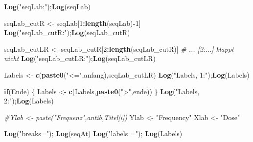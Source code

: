 \documentclass[
]{article}
\newenvironment{Shaded}{\begin{snugshade}}{\end{snugshade}}
\newcommand{\CommentTok}[1]{\textcolor[rgb]{0.56,0.35,0.01}{\textit{#1}}}
\newcommand{\ControlFlowTok}[1]{\textcolor[rgb]{0.13,0.29,0.53}{\textbf{#1}}}
\newcommand{\DecValTok}[1]{\textcolor[rgb]{0.00,0.00,0.81}{#1}}
\newcommand{\KeywordTok}[1]{\textcolor[rgb]{0.13,0.29,0.53}{\textbf{#1}}}
\newcommand{\NormalTok}[1]{#1}
\newcommand{\OperatorTok}[1]{\textcolor[rgb]{0.81,0.36,0.00}{\textbf{#1}}}
\newcommand{\StringTok}[1]{\textcolor[rgb]{0.31,0.60,0.02}{#1}}
\begin{document}
\begin{Shaded}
\begin{Highlighting}[]
{{{  \KeywordTok{Log}\NormalTok{(}\StringTok{"seqLab:"}\NormalTok{);}\KeywordTok{Log}\NormalTok{(seqLab)}
    
\NormalTok{  seqLab_cutR <-}\StringTok{ }\NormalTok{seqLab[}\DecValTok{1}\OperatorTok{:}\KeywordTok{length}\NormalTok{(seqLab)}\OperatorTok{-}\DecValTok{1}\NormalTok{]           }
  \KeywordTok{Log}\NormalTok{(}\StringTok{"seqLab_cutR:"}\NormalTok{);}\KeywordTok{Log}\NormalTok{(seqLab_cutR)}
    
\NormalTok{  seqLab_cutLR <-}\StringTok{ }\NormalTok{seqLab_cutR[}\DecValTok{2}\OperatorTok{:}\KeywordTok{length}\NormalTok{(seqLab_cutR)]  }\CommentTok{# ... [2:...] klappt nicht}
  \KeywordTok{Log}\NormalTok{(}\StringTok{"seqLab_cutLR:"}\NormalTok{);}\KeywordTok{Log}\NormalTok{(seqLab_cutLR)}
    
\NormalTok{  Labels <-}\StringTok{ }\KeywordTok{c}\NormalTok{(}\KeywordTok{paste0}\NormalTok{(}\StringTok{"<="}\NormalTok{,anfang),seqLab_cutLR)}
  \KeywordTok{Log}\NormalTok{(}\StringTok{"Labels, 1:"}\NormalTok{);}\KeywordTok{Log}\NormalTok{(Labels)}
    
  \ControlFlowTok{if}\NormalTok{(Ende) \{ Labels <-}\StringTok{ }\KeywordTok{c}\NormalTok{(Labels,}\KeywordTok{paste0}\NormalTok{(}\StringTok{">"}\NormalTok{,ende)) \}}
  \KeywordTok{Log}\NormalTok{(}\StringTok{"Labels, 2:"}\NormalTok{);}\KeywordTok{Log}\NormalTok{(Labels)}

  \CommentTok{#Ylab <- paste("Frequenz",antib,Titel[i])}
\NormalTok{  Ylab <-}\StringTok{ "Frequency"}
\NormalTok{  Xlab <-}\StringTok{ "Dose"}

  \KeywordTok{Log}\NormalTok{(}\StringTok{"breaks="}\NormalTok{); }\KeywordTok{Log}\NormalTok{(seqAt)}
  \KeywordTok{Log}\NormalTok{(}\StringTok{"labels ="}\NormalTok{); }\KeywordTok{Log}\NormalTok{(Labels)}
    
}}}
\end{Highlighting}
\end{Shaded}
\end{document}
